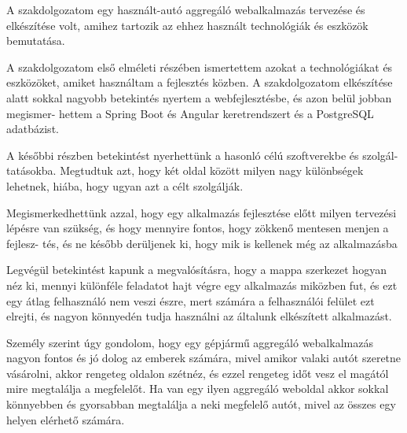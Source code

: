 
A szakdolgozatom egy használt-autó aggregáló webalkalmazás tervezése és elkészítése volt, amihez tartozik az ehhez használt technológiák és eszközök bemutatása.

A szakdolgozatom első elméleti részében ismertettem azokat a technológiákat és eszközöket, amiket használtam a fejlesztés közben. A szakdolgozatom elkészítése alatt sokkal nagyobb betekintés nyertem a webfejlesztésbe, és azon belül jobban megismer-
hettem a Spring Boot és Angular keretrendszert és a PostgreSQL adatbázist.

A későbbi részben betekintést nyerhettünk a hasonló célú szoftverekbe és szolgál-
tatásokba. Megtudtuk azt, hogy két oldal között milyen nagy különbségek lehetnek, hiába, hogy ugyan azt a célt szolgálják.

Megismerkedhettünk azzal, hogy egy alkalmazás fejlesztése előtt milyen tervezési lépésre van szükség, és hogy mennyire fontos, hogy zökkenő mentesen menjen a fejlesz-
tés, és ne később derüljenek ki, hogy mik is kellenek még az alkalmazásba

Legvégül betekintést kapunk a megvalósításra, hogy a mappa szerkezet hogyan néz ki, mennyi különféle feladatot hajt végre egy alkalmazás miközben fut, és ezt egy átlag felhasználó nem veszi észre, mert számára a felhasználói felület ezt elrejti, és nagyon könnyedén tudja használni az általunk elkészített alkalmazást.

Személy szerint úgy gondolom, hogy egy gépjármű aggregáló webalkalmazás nagyon fontos és jó dolog az emberek számára, mivel amikor valaki autót szeretne vásárolni, akkor rengeteg oldalon szétnéz, és ezzel rengeteg időt vesz el magától mire megtalálja a megfelelőt. Ha van egy ilyen aggregáló weboldal akkor sokkal könnyebben és gyorsabban megtalálja a neki megfelelő autót, mivel az összes egy helyen elérhető számára. 
